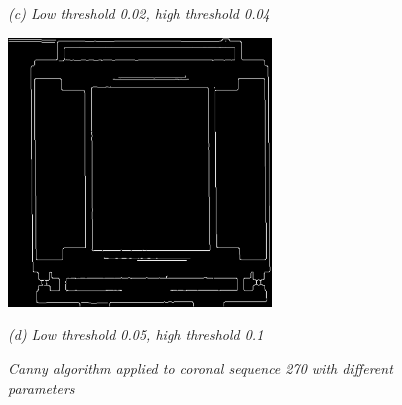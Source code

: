 \begin{figure}[htb]
\begin{minipage}[t]{2.75in}
    \centerline{\emph{(c) Low threshold 0.02, high threshold  0.04}}
  \end{minipage}\medskip
  \begin{minipage}[t]{2.75in}
    \centering
    \centerline{\mbox{\includegraphics[width=2.75in]{data_extraction/images/canny/0.05_0.1/20121017_270.eps}}}
    \centerline{\emph{(d) Low threshold 0.05, high threshold  0.1}}
  \end{minipage}
  \caption{\emph{Canny algorithm applied to coronal sequence 270 with different parameters}} \label{fig:canny_ct_270}
\end{figure}

